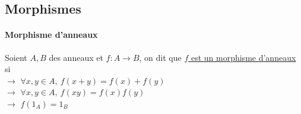 	\subsection{Morphismes}
		\traitd
		\paragraph{Morphisme d'anneaux}
			Soient $A,B$ des anneaux et $f:A\to B$, on dit que \uline{$f$ est un morphisme d'anneaux} si \\
			\hspace*{2cm} $\rightarrow$ $\forall x,y \in A ,~f(x+y)= f(x)+f(y)$\\
			\hspace*{2cm} $\rightarrow$ $\forall x,y \in A ,~f(xy) = f(x)f(y)$ \\
			\hspace*{2cm} $\rightarrow$ $f(1_A) = 1_B$  \trait ${}$ \vspace*{-1.5cm} \\ \traitd 
